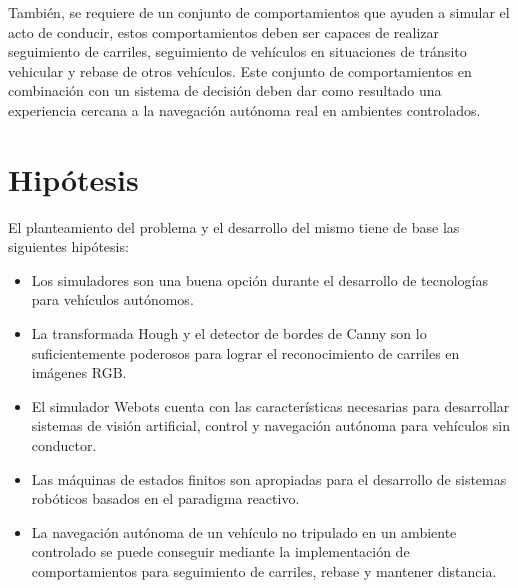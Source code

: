 También, se requiere de un conjunto de comportamientos que ayuden a simular el acto de conducir, estos comportamientos deben ser capaces de realizar seguimiento de carriles, seguimiento de vehículos en situaciones de tránsito vehicular y rebase de otros vehículos. Este conjunto de comportamientos en combinación con un sistema de decisión deben dar como resultado una experiencia cercana a la navegación autónoma real en ambientes controlados.


\section{Hipótesis}

El planteamiento del problema y el desarrollo del mismo tiene de base las siguientes hipótesis:
\begin{itemize}
    \item Los simuladores son una buena opción durante el desarrollo de tecnologías para vehículos autónomos.
    \item La transformada Hough y el detector de bordes de Canny son lo suficientemente poderosos para lograr el reconocimiento de carriles en imágenes RGB.
    \item El simulador Webots cuenta con las características necesarias para desarrollar sistemas de visión artificial, control y navegación autónoma para vehículos sin conductor.
    \item Las máquinas de estados finitos son apropiadas para el desarrollo de sistemas robóticos basados en el paradigma reactivo.
    \item La navegación autónoma de un vehículo no tripulado en un ambiente controlado se puede conseguir mediante la implementación de comportamientos para seguimiento de carriles, rebase y mantener distancia.
\end{itemize}

